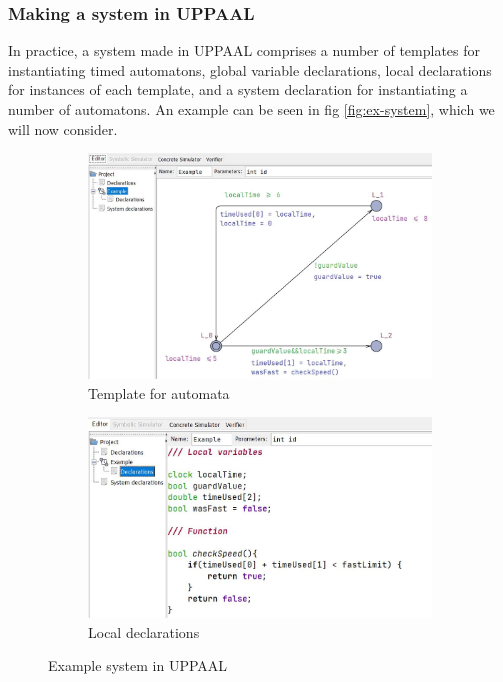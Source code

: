 \subsubsection{Making a system in UPPAAL}

In practice, a system made in UPPAAL comprises a number of templates for instantiating timed automatons, global variable declarations, local declarations for instances of each template, and a system declaration for instantiating a number of automatons. An example can be seen in fig \ref{fig:ex-system}, which we will now consider.


\begin{figure}[!b]
    \centering
    \begin{subfigure}{0.90\textwidth}
        \centering
    \includegraphics[width=\textwidth]{pictures/example_model_timed.JPG}
    \caption{Template for automata}
    \label{fig:ex-template}
    \end{subfigure}
     
    \medskip
     
    \begin{subfigure}{0.90\textwidth}
         \centering
    \includegraphics[width=\textwidth]{pictures/Local_declarations_example.JPG}
    \caption{Local declarations}
    \label{fig:ex-local-declarations}
    \end{subfigure}
    
    \caption{Example system in UPPAAL}
\end{figure}

